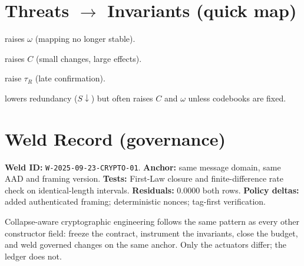 \section{Threats \texorpdfstring{$\rightarrow$}{} Invariants (quick map)}
\begin{description}[leftmargin=1.2em,labelindent=0em,style=nextline]
  \item[Nonce reuse / replay] raises \(\omega\) (mapping no longer stable).
  \item[Ambiguous framing / parsing] raises \(C\) (small changes, large effects).
  \item[Slow verification paths] raise \(\tau_{R}\) (late confirmation).
  \item[Aggressive compression] lowers redundancy (\(S\downarrow\)) but often raises \(C\) and \(\omega\) unless codebooks are fixed.
\end{description}

\section{Weld Record (governance)}
\noindent\textbf{Weld ID:} \texttt{W-2025-09-23-CRYPTO-01}. \;
\textbf{Anchor:} same message domain, same AAD and framing version. \;
\textbf{Tests:} First-Law closure and finite-difference rate check on identical-length intervals. \;
\textbf{Residuals:} \(0.0000\) both rows. \;
\textbf{Policy deltas:} added authenticated framing; deterministic nonces; tag-first verification.

\medskip
\noindent
Collapse-aware cryptographic engineering follows the same pattern as every other constructor field: freeze the contract, instrument the invariants, close the budget, and weld governed changes on the same anchor. Only the actuators differ; the ledger does not.
